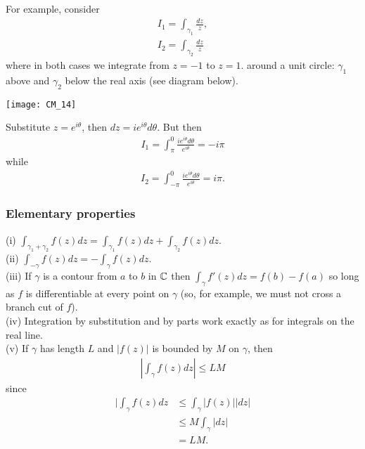 \documentclass[a4paper]{article}
\begin{document}
For example, consider
\begin{equation*}
\begin{aligned}
I_1 = \int_{\gamma_1} \frac{dz}{z},\\
I_2 = \int_{\gamma_2} \frac{dz}{z}
\end{aligned}
\end{equation*}
where in both cases we integrate from $z=-1$ to $z=1$. around a unit circle: $\gamma_1$ above and $\gamma_2$ below the real axis (see diagram below).

\texttt{[image: CM\_14]}

Substitute $z=e^{i\theta}$, then $dz = ie^{i\theta} d\theta$. But then
\begin{equation*}
\begin{aligned}
I_1 = \int_\pi^0 \frac{ie^{i\theta}d\theta}{e^{i\theta}} = -i\pi
\end{aligned}
\end{equation*}
while
\begin{equation*}
\begin{aligned}
I_2 = \int_{-\pi}^0 \frac{ie^{i\theta}d\theta}{e^{i\theta}} = i\pi.
\end{aligned}
\end{equation*}

\subsubsection{Elementary properties}
(i) $\int_{\gamma_1+\gamma_2} f(z) dz = \int_{\gamma_1} f(z) dz + \int_{\gamma_2} f(z) dz$.\\
(ii) $\int_{-\gamma} f(z) dz = -\int_\gamma f(z) dz$.\\
(iii) If $\gamma$ is a contour from $a$ to $b$ in $\mathbb{C}$ then $\int_\gamma f'(z) dz = f(b)-f(a)$ so long as $f$ is differentiable at every point on $\gamma$ (so, for example, we must not cross a branch cut of $f$).\\
(iv) Integration by substitution and by parts work exactly as for integrals on the real line.\\
(v) If $\gamma$ has length $L$ and $|f(z)|$ is bounded by $M$ on $\gamma$, then
\begin{equation*}
\begin{aligned}
|\int_\gamma f(z) dz| \leq LM
\end{aligned}
\end{equation*}
since
\begin{equation*}
\begin{aligned}
|\int_\gamma f(z) dz &\leq \int_\gamma |f(z)| |dz|\\
&\leq M\int_\gamma |dz|\\
&=LM.
\end{aligned}
\end{equation*}
\end{document}
